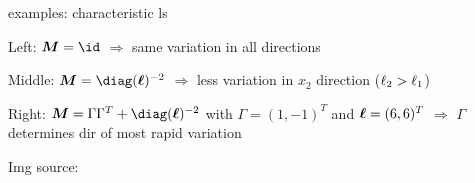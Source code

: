 \documentclass[11pt,compress,t,notes=noshow, xcolor=table]{beamer}
\begin{document}
\begin{framei}{examples: characteristic ls}
\item Left: $\bm{M} = \id$ $\Rightarrow$ same variation in all directions
\item Middle: $\bm{M} = \diag(\bm{\ls})^{-2}$ $\Rightarrow$ less variation in $x_2$ direction ($\ell_2 > \ell_1$)
\item Right: $\bm{M} = \Gamma \Gamma^T + \diag(\bm{\ls})^{-2}$ with $\Gamma = (1, -1)^T$ and $\bm{\ell} = (6, 6)^T$ $\Rightarrow$ $\Gamma$ determines dir of most rapid variation
\vfill
{}
\item Img source: 
\end{framei}

\endlecture
\end{document}
